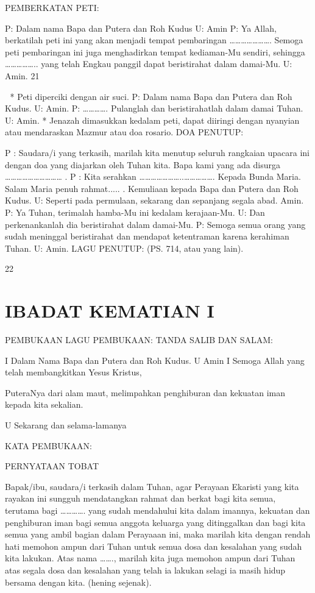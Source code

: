 \documentclass[10pt,a5paper,fancyhdr]{memoir}
\begin{document}
PEMBERKATAN PETI: 

P: Dalam nama Bapa dan Putera dan Roh Kudus 
U: Amin 
P: Ya Allah, berkatilah peti ini yang akan menjadi tempat 
pembaringan …………………. Semoga peti pembaringan ini juga 
menghadirkan tempat kediaman-Mu sendiri, sehingga …………….. 
yang telah Engkau panggil dapat beristirahat dalam damai-Mu. 
U: Amin. 
21 



* Peti diperciki dengan air suci. 
P: Dalam nama Bapa dan Putera dan Roh Kudus. 
U: Amin. 
P: …………. Pulanglah dan beristirahatlah dalam damai Tuhan. 
U: Amin. 
* Jenazah dimasukkan kedalam peti, dapat diiringi dengan nyanyian 
atau mendaraskan Mazmur atau doa rosario. 
DOA PENUTUP: 

P : Saudara/i yang terkasih, marilah kita menutup seluruh rangkaian 
upacara ini dengan doa yang diajarkan oleh Tuhan kita. Bapa kami 
yang ada disurga …………………………
. 
P : Kita serahkan …………………..……………. Kepada Bunda 
Maria. Salam Maria penuh rahmat.....
. 
Kemuliaan kepada Bapa dan Putera dan Roh Kudus. 
U: Seperti pada permulaan, sekarang dan sepanjang segala abad. 
Amin. 
P: Ya Tuhan, terimalah hamba-Mu ini kedalam kerajaan-Mu. 
U: Dan perkenankanlah dia beristirahat dalam damai-Mu. 
P: Semoga semua orang yang sudah meninggal beristirahat dan 
mendapat ketentraman karena kerahiman Tuhan. 
U: Amin. 
LAGU PENUTUP: (PS. 714, atau yang lain). 

22 



\chapter{IBADAT KEMATIAN I}


PEMBUKAAN 
LAGU PEMBUKAAN: 
TANDA SALIB DAN SALAM: 

I Dalam Nama Bapa dan Putera dan Roh Kudus. 
U Amin 
I Semoga Allah yang telah membangkitkan Yesus Kristus, 

PuteraNya dari alam maut, melimpahkan penghiburan dan kekuatan 
iman kepada kita sekalian. 

U Sekarang dan selama-lamanya 

KATA PEMBUKAAN: 

PERNYATAAN TOBAT 

Bapak/ibu, saudara/i terkasih dalam Tuhan, agar Perayaan 
Ekaristi yang kita rayakan ini sungguh mendatangkan rahmat dan 
berkat bagi kita semua, terutama bagi …………. yang sudah 
mendahului kita dalam imannya, kekuatan dan penghiburan iman 
bagi semua anggota keluarga yang ditinggalkan dan bagi kita semua 
yang ambil bagian dalam Perayaaan ini, maka marilah kita dengan 
rendah hati memohon ampun dari Tuhan untuk semua dosa dan 
kesalahan yang sudah kita lakukan. Atas nama ……., marilah kita 
juga memohon ampun dari Tuhan atas segala dosa dan kesalahan 
yang telah ia lakukan selagi ia masih hidup bersama dengan kita. 
(hening sejenak). 
\end{document}
